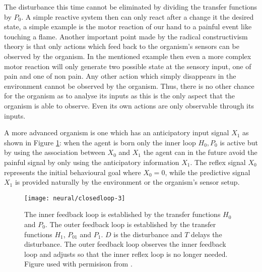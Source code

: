 The disturbance this time cannot be eliminated by dividing the transfer functions by $P_0$.
A simple reactive system then can only react after a change it the desired state, 
a simple example is the motor reaction of our hand to a painful event like touching a 
flame. 
Another important point made by the radical constructivism theory is that only actions which 
feed back to the organism's sensors can be observed by the organism. 
In the mentioned example then even a more complex motor reaction will only generate 
two possible state at the sensory input, one of pain and one of non pain.
Any other action which simply disappears in the environment cannot be
observed by the organism. Thus, there is no other chance for the organism as to
analyse its inputs as this is the only aspect that the organism is able to observe.
Even its own actions are only observable through its inputs.

A more advanced organism is one which has an anticipatory input signal $X_1$ as
 shown in Figure \ref{Fig:Neural:ProactiveDisturbance}:
when the agent is born only the inner loop $H_0,P_0$ is active but by using the 
association between $X_0$ and $X_1$ the agent can in the future avoid the 
painful signal by only using the anticipatory information $X_1$.
The reﬂex signal $X_0$ represents the initial behavioural
goal \citep{Verschure98summary} where $X_0=0$, while the predictive signal $X_1$
is provided naturally by the environment or the organism's sensor setup.

\begin{figure}[htbp]
\begin{center}
\texttt{[image: neural/closedloop-3]}
\end{center}
\small{
\caption[Closed loop proactive system with disturbance]{
The inner feedback loop is established by the transfer functions $H_0$
and $P_0$. 
The outer feedback loop is established by the transfer functions $H_1$, $P_{01}$ 
and $P_1$. $D$ is the disturbance and $T$ delays the disturbance. 
The outer feedback loop observes the inner feedback loop and adjusts
so that the inner reﬂex loop is no longer needed. Figure used with permisison from \citet{Porr2006cf}.
\label{Fig:Neural:ProactiveDisturbance}}}
\end{figure}


